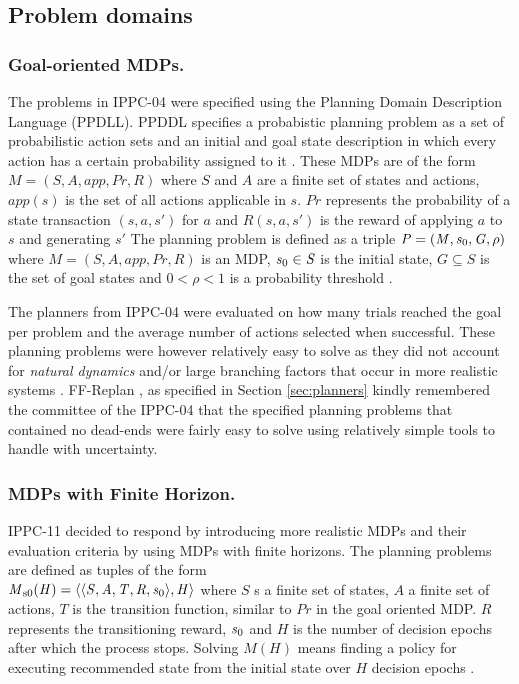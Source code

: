 \documentclass[runningheads,a4paper]{llncs}
\begin{document}
\subsection{Problem domains}

\subsubsection{Goal-oriented MDPs. }The problems in IPPC-04 were specified using the Planning Domain Description Language (PPDLL). PPDDL specifies a probabistic planning problem as a set of probabilistic action sets and an initial and goal state description in which every action has a certain probability assigned to it \cite{FFReplan}. These MDPs are of the form $\mathit{M = (S, A, app, Pr, R)}$ where $\mathit{S}$ and $\mathit{A}$ are a finite set of states and actions, $\mathit{app(s)}$ is the set of all actions applicable in $\mathit{s}$. $\mathit{Pr}$ represents the probability of a state transaction $\mathit{(s, a, s')}$ for $\mathit{a}$ and $\mathit{R(s, a, s')}$ is the reward of applying $\mathit{a}$ to $\mathit{s}$ and generating $\mathit{s'}$ The planning problem is defined as a triple $\mathit{P = (M, s\textsubscript{0}, G, \rho)}$ where $\mathit{M = (S, A, app, Pr, R)}$ is an MDP, $\mathit{s\textsubscript{0} \in S}$ is the initial state, $\mathit{G \subseteq S}$ is the set of goal states and $\mathit{0 < \rho < 1}$ is a probability threshold \cite{teichteil2010incremental}.

 The planners from IPPC-04 were evaluated on how many trials reached the goal per problem and the average number of actions selected when successful. These planning problems were however relatively easy to solve as they did not account for \emph{natural dynamics} and/or large branching factors that occur in more realistic systems \cite{kolobov2012glutton}. FF-Replan \cite{FFReplan}, as specified in Section \ref{sec:planners} kindly remembered the committee of the IPPC-04 that the specified planning problems that contained no dead-ends were fairly easy to solve using relatively simple tools to handle with uncertainty.

\subsubsection{MDPs with Finite Horizon. }IPPC-11 decided to respond by introducing more realistic MDPs and their evaluation criteria by using MDPs with finite horizons. The planning problems are defined as tuples of the form \\ $\mathit{M\textsubscript{s0}(H) = \langle \langle S, A, T, R, s\textsubscript{0} \rangle , H \rangle }$ where $\mathit{S}$ s a finite set of states, $\mathit{A}$ a finite set of actions, $\mathit{T}$ is the transition function, similar to $\mathit{Pr}$ in the goal oriented MDP. $\mathit{R}$ represents the transitioning reward, $\mathit{s\textsubscript{0}}$ and $\mathit{H}$ is the number of decision epochs after which the process stops. Solving $\mathit{M(H)}$ means finding a policy for executing recommended state from the initial state over $\mathit{H}$ decision epochs \cite{kolobov2012gourmand}.
\end{document}
